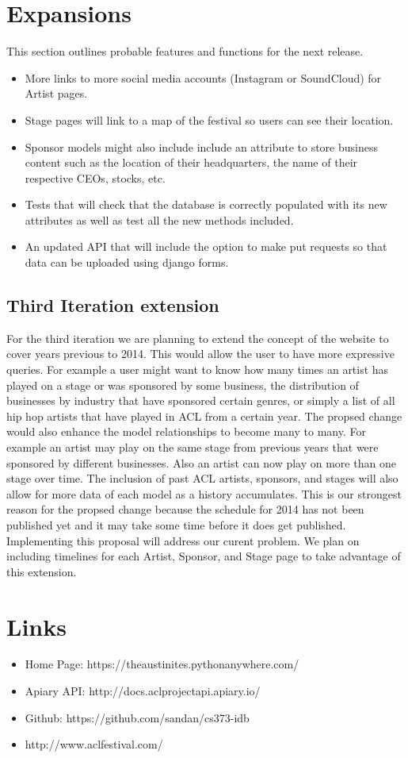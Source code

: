 \documentclass[12pt,english]{scrartcl}
\begin{document}
\section{Expansions}
This section outlines probable features and functions for the next release.
\begin{itemize}

\item More links to more social media accounts (Instagram or SoundCloud) for Artist pages.

\item Stage pages will link to a map of the festival so users can see their location.

\item Sponsor models might also include include an attribute to store business content such as the location of their headquarters, the name of their respective CEOs, stocks, etc.

\item  Tests that will check that the database is correctly populated with its new attributes as well as test all the new methods included.

\item An updated API that will include the option to make put requests so that data can be uploaded using django forms.
\end{itemize}

\subsection{Third Iteration extension}
For the third iteration we are planning to extend the concept of the website to cover years previous to 2014. This would allow 
the user to have more  expressive queries. For example a user might want to know  how many times an artist has played on a stage
or was sponsored by some business, the distribution of businesses by industry that have sponsored certain genres, or simply a 
list of all hip hop artists that have played in ACL from a certain year.
 The propsed change would also enhance the model relationships to become many to many. For example an artist may play on the same stage
 from previous years that were sponsored by different businesses. Also an artist can now play on more than one stage over time. The 
 inclusion of past ACL artists, sponsors, and stages will also allow for more data of each model as a history accumulates. This is our strongest
 reason for the propsed change because the schedule for 2014 has not been published yet and it may take some time before it does get published. Implementing this
 proposal will address our curent problem. We plan on including timelines for each Artist, Sponsor, and Stage page to take advantage of this extension.
 
\section{Links}

\begin{itemize}
 \item Home Page: https://theaustinites.pythonanywhere.com/
 \item Apiary API: http://docs.aclprojectapi.apiary.io/
 \item Github: https://github.com/sandan/cs373-idb
 \item http://www.aclfestival.com/
\end{itemize}
\end{document}
